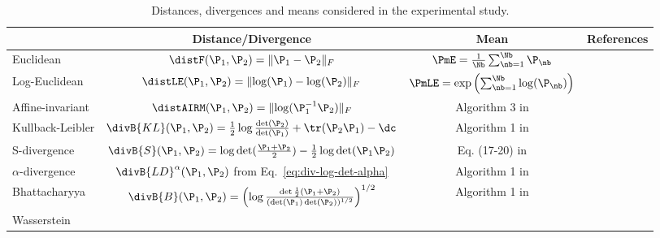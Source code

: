 \begin{table}[h]
  \centering
  \begin{tabular}{ l | c | c | c |}
    \cline{2-4}
    & Distance/Divergence & Mean & References \rule[-5pt]{0pt}{18pt} \\ \hline
    \multicolumn{1}{|l|}{Euclidean} & $\distF(\P_1, \P_2) = \lVert \P_1-\P_2 \rVert _F$ & $\PmE = \frac{1}{\Nb}\sum_{\nb=1}^{\Nb} \P_\nb$ & \rule[-5pt]{0pt}{18pt} \\   
		 \multicolumn{1}{|l|}{Log-Euclidean} & $\distLE(\P_1, \P_2) = \lVert \log(\P_1)-\log(\P_2) \rVert_F$ & $\PmLE = \exp \left(\sum_{\nb=1}^{\Nb} \log(\P_\nb) \right) $ & \cite{arsigny_geometric_2007} 
		\rule[-5pt]{0pt}{18pt} \\    
     \multicolumn{1}{|l|}{Affine-invariant} & $\distAIRM(\P_1, \P_2) = \lVert \log(\P_1^{-1}\P_2) \rVert_F$ & Algorithm 3 in \cite{fletcher_principal_2004}  & \cite{moakher_differential_2005,letcher_principal_2004} 
		\rule[-5pt]{0pt}{18pt} \\	
	\multicolumn{1}{|l|}{Kullback-Leibler} & $\divB{KL}(\P_1, \P_2) = \frac{1}{2} \log \frac{\det(\P_2)}{\det(\P_1)} + \tr(\P_2 \P_1) - \dc$ & Algorithm 1 in \cite{chebbi_means_2012} & \cite{chebbi_means_2012,kang_composite_2009} \rule[-5pt]{0pt}{18pt} \\
	\multicolumn{1}{|l|}{S-divergence} & $\divB{S}(\P_1,\P_2) = \log \det(\frac{\P_1+\P_2}{2}) - \frac{1}{2}\log \det(\P_1 \P_2)$ &  Eq. (17-20) in \cite{cherian_efficient_2011} & \cite{sra_positive_2016,cherian_efficient_2011} \rule[-5pt]{0pt}{18pt} \\
    \multicolumn{1}{|l|}{$\alpha$-divergence} & $\divB{LD}^\alpha (\P_1, \P_2)$ from Eq.~\eqref{eq:div-log-det-alpha} & Algorithm 1 in \cite{chebbi_means_2012} & \cite{chebbi_means_2012} \rule[-5pt]{0pt}{18pt} \\ 
    \multicolumn{1}{|l|}{Bhattacharyya} & $\divB{B}(\P_1, \P_2)=\left( \log \frac{ \det \frac{1}{2} (\P_1+\P_2)}{(\det (\P_1)\det(\P_2))^{1/2}} \right)^{1/2}$ & Algorithm 1 in \cite{chebbi_means_2012} & \cite{nielsen_matrix_2012,chebbi_means_2012} \rule[-5pt]{0pt}{18pt} \\ 
    \multicolumn{1}{|l|}{Wasserstein} &  &  &  \rule[-5pt]{0pt}{18pt} \\ \hline
  \end{tabular}
  \caption{Distances, divergences and means considered in the experimental study.}
  \label{tab:dist}
\end{table}
